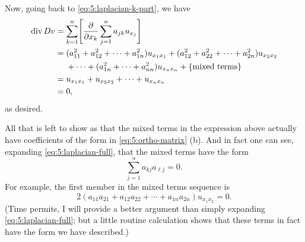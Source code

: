 \begin{solution*}
  Now, going back to \eqref{eq:5:laplacian-k-part}, we have
  \begin{equation}
    \label{eq:5:laplacian-full}
    \begin{aligned}
      \Div Dv &=\sum_{k=1}^n\Biggl[\frac{\partial}{\partial
        x_k}\sum_{j=1}^n
      a_{jk}u_{x_j}\Biggr]\\
      &=(a_{11}^2+a_{12}^2+\dotsb+a_{1n}^2)u_{x_1x_1}+(a_{12}^2+a_{22}^2+\dotsb+a_{2n}^2)u_{x_2x_2}\\
      &\phantom{{}={}}+\dotsb+(a_{1n}^2+\dotsb+a_{nn}^2)u_{x_nx_n}+\{\text{mixed
        terms}\}\\
      &=u_{x_1x_1}+u_{x_2x_2}+\dotsb+u_{x_nx_n}\\
      &=0,
    \end{aligned}
  \end{equation}
  as desired.

  All that is left to show as that the mixed terms in the expression above
  actually have coefficients of the form in \eqref{eq:5:ortho-matrix}
  (b). And in fact one can see, expanding \eqref{eq:5:laplacian-full}, that
  the mixed terms have the form
  \[
    \sum_{j=1}^na_{kj}a_{\ell j}=0.
  \]
  For example, the first member in the mixed terms sequence is
  \[
    2(a_{11}a_{21}+a_{12}a_{22}+\dotsb+a_{1n}a_{2n})u_{x_1x_2}=0.
  \]
  (Time permits, I will provide a better argument than simply expanding
  \eqref{eq:5:laplacian-full}; but a little routine calculation shows that
  these terms in fact have the form we have described.)
\end{solution*}

